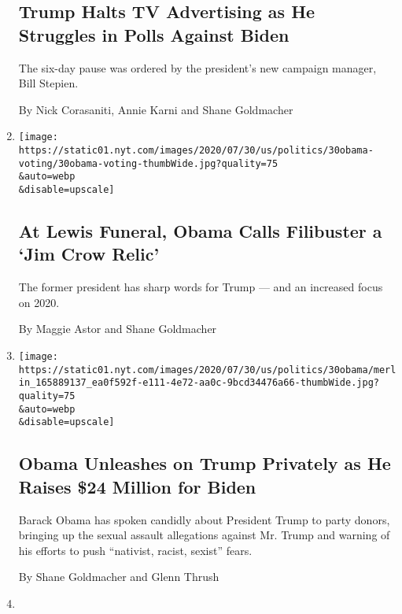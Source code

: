 \begin{enumerate}
{  \subsection{Trump Halts TV Advertising as He Struggles in Polls
  Against
  Biden}\label{trump-halts-tv-advertising-as-he-struggles-in-polls-against-biden}}

  The six-day pause was ordered by the president's new campaign manager,
  Bill Stepien.

  By Nick Corasaniti, Annie Karni and Shane Goldmacher
\item
  \href{/2020/07/30/us/politics/john-lewis-funeral-barack-obama.html}{}

  \texttt{[image: https://static01.nyt.com/images/2020/07/30/us/politics/30obama-voting/30obama-voting-thumbWide.jpg?quality=75\\\&auto=webp\\\&disable=upscale]}

  \hypertarget{at-lewis-funeral-obama-calls-filibuster-a-jim-crow-relic}{%
  \subsection{At Lewis Funeral, Obama Calls Filibuster a `Jim Crow
  Relic'}\label{at-lewis-funeral-obama-calls-filibuster-a-jim-crow-relic}}

  The former president has sharp words for Trump --- and an increased
  focus on 2020.

  By Maggie Astor and Shane Goldmacher
\item
  \href{/2020/07/30/us/politics/obama-trump-biden.html}{}

  \texttt{[image: https://static01.nyt.com/images/2020/07/30/us/politics/30obama/merlin\_165889137\_ea0f592f-e111-4e72-aa0c-9bcd34476a66-thumbWide.jpg?quality=75\\\&auto=webp\\\&disable=upscale]}

  \hypertarget{obama-unleashes-on-trump-privately-as-he-raises-24-million-for-biden}{%
  \subsection{Obama Unleashes on Trump Privately as He Raises \$24
  Million for
  Biden}\label{obama-unleashes-on-trump-privately-as-he-raises-24-million-for-biden}}

  Barack Obama has spoken candidly about President Trump to party
  donors, bringing up the sexual assault allegations against Mr. Trump
  and warning of his efforts to push ``nativist, racist, sexist'' fears.

  By Shane Goldmacher and Glenn Thrush
\item
  \href{/2020/07/29/us/politics/michigan-trump-biden-2020.html}{}


\end{enumerate}
